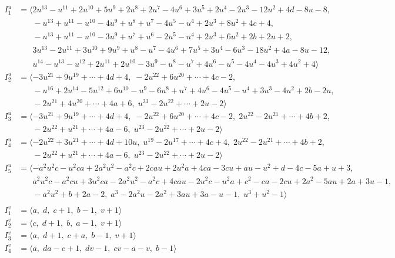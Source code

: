 \documentclass[1p]{elsarticle_modified}
\theoremstyle{definition}
\begin{document}
\begin{align*}
I^u_{1}&=\langle 
2 u^{13}- u^{11}+2 u^{10}+5 u^9+2 u^8+2 u^7-4 u^6+3 u^5+2 u^4-2 u^3-12 u^2+4 d-8 u-8,\\
\phantom{I^u_{1}}&\phantom{= \langle  }- u^{13}+u^{11}- u^{10}-4 u^9+u^8+u^7-4 u^5- u^4+2 u^3+8 u^2+4 c+4,\\
\phantom{I^u_{1}}&\phantom{= \langle  }- u^{13}+u^{11}- u^{10}-3 u^9+u^7+u^6-2 u^5- u^4+2 u^3+6 u^2+2 b+2 u+2,\\
\phantom{I^u_{1}}&\phantom{= \langle  }3 u^{13}-2 u^{11}+3 u^{10}+9 u^9+u^8- u^7-4 u^6+7 u^5+3 u^4-6 u^3-18 u^2+4 a-8 u-12,\\
\phantom{I^u_{1}}&\phantom{= \langle  }u^{14}- u^{13}- u^{12}+2 u^{11}+2 u^{10}-3 u^9- u^8- u^7+4 u^6- u^5-4 u^4-4 u^3+4 u^2+4\rangle \\
I^u_{2}&=\langle 
-3 u^{21}+9 u^{19}+\cdots+4 d+4,\;-2 u^{22}+6 u^{20}+\cdots+4 c-2,\\
\phantom{I^u_{2}}&\phantom{= \langle  }- u^{16}+2 u^{14}-5 u^{12}+6 u^{10}- u^9-6 u^8+u^7+4 u^6-4 u^5- u^4+3 u^3-4 u^2+2 b-2 u,\\
\phantom{I^u_{2}}&\phantom{= \langle  }-2 u^{21}+4 u^{20}+\cdots+4 a+6,\;u^{23}-2 u^{22}+\cdots+2 u-2\rangle \\
I^u_{3}&=\langle 
-3 u^{21}+9 u^{19}+\cdots+4 d+4,\;-2 u^{22}+6 u^{20}+\cdots+4 c-2,\;2 u^{22}-2 u^{21}+\cdots+4 b+2,\\
\phantom{I^u_{3}}&\phantom{= \langle  }-2 u^{22}+u^{21}+\cdots+4 a-6,\;u^{23}-2 u^{22}+\cdots+2 u-2\rangle \\
I^u_{4}&=\langle 
-2 u^{22}+3 u^{21}+\cdots+4 d+10 u,\;u^{19}-2 u^{17}+\cdots+4 c+4,\;2 u^{22}-2 u^{21}+\cdots+4 b+2,\\
\phantom{I^u_{4}}&\phantom{= \langle  }-2 u^{22}+u^{21}+\cdots+4 a-6,\;u^{23}-2 u^{22}+\cdots+2 u-2\rangle \\
I^u_{5}&=\langle 
- a^2 u^2 c- u^2 c a+2 a^2 u^2- a^2 c+2 c a u+2 u^2 a+4 c a-3 c u+a u- u^2+d-4 c-5 a+u+3,\\
\phantom{I^u_{5}}&\phantom{= \langle  }a^2 u^2 c- a^2 c u+3 u^2 c a-2 a^2 u^2- a^2 c+4 c a u-2 u^2 c- u^2 a+c^2- c a-2 c u+2 a^2-5 a u+2 a+3 u-1,\\
\phantom{I^u_{5}}&\phantom{= \langle  }- a^2 u^2+b+2 a-2,\;a^3-2 a^2 u-2 a^2+3 a u+3 a- u-1,\;u^3+u^2-1\rangle \\
\\
I^v_{1}&=\langle 
a,\;d,\;c+1,\;b-1,\;v+1\rangle \\
I^v_{2}&=\langle 
c,\;d+1,\;b,\;a-1,\;v+1\rangle \\
I^v_{3}&=\langle 
a,\;d+1,\;c+a,\;b-1,\;v+1\rangle \\
I^v_{4}&=\langle 
a,\;d a- c+1,\;d v-1,\;c v- a- v,\;b-1\rangle \\
\end{align*}
\end{document}

